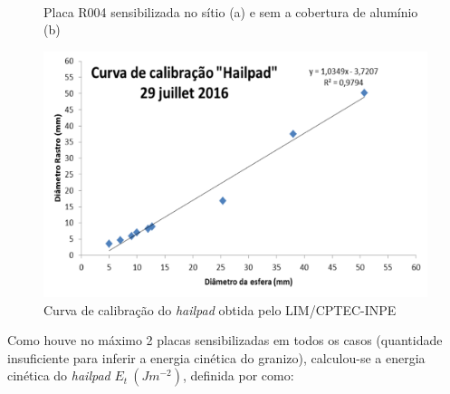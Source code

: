\begin{figure}[htb]
	\begin{center}
		\caption{Placa R004 sensibilizada no sítio (a) e sem a cobertura de alumínio (b)} 
		\label{hailpad_exemplo}
		\quad
		\\
	\end{center}
\end{figure}

\begin{figure}[htb]
	\begin{center}
		\caption{Curva de calibração do \textit{hailpad} obtida pelo LIM/CPTEC-INPE \cite{ThomazJunior2016}} 
		\label{calibracao_hailpad}
		\includegraphics[width=0.7\columnwidth]{figs/calibracao_hailpad.png}
	\end{center}
\end{figure}

Como houve no máximo 2 placas sensibilizadas em todos os casos (quantidade insuficiente para inferir a energia cinética do granizo), calculou-se a energia cinética do \textit{hailpad} $E_t\:(Jm^{-2})$, definida por  como:

